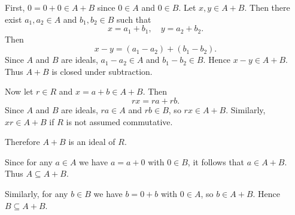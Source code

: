 \begin{solution}[(i)]
  First, $0 = 0 + 0 \in A + B$ since $0 \in A$ and $0 \in B$. Let $x, y \in A + B$. Then there exist $a_1, a_2 \in A$ and $b_1, b_2 \in B$ such that
  \[%
    x = a_1 + b_1, \quad y = a_2 + b_2
  .\]%
  Then
  \[%
    x - y = (a_1 - a_2) + (b_1 - b_2)
  .\]%
  Since $A$ and $B$ are ideals, $a_1 - a_2 \in A$ and $b_1 - b_2 \in B$. Hence $x - y \in A + B$. Thus $A + B$ is closed under subtraction.

  Now let $r \in R$ and $x = a + b \in A + B$. Then
  \[%
    rx = ra + rb
  .\]%
  Since $A$ and $B$ are ideals, $ra \in A$ and $rb \in B$, so $rx \in A + B$. Similarly, $xr \in A + B$ if $R$ is not assumed commutative.

  Therefore $A + B$ is an ideal of $R$.
\end{solution}

\begin{solution}[(ii)]
  Since for any $a \in A$ we have $a = a + 0$ with $0 \in B$, it follows that $a \in A + B$. Thus $A \subseteq A + B$.

  Similarly, for any $b \in B$ we have $b = 0 + b$ with $0 \in A$, so $b \in A + B$. Hence $B \subseteq A + B$.
\end{solution}
